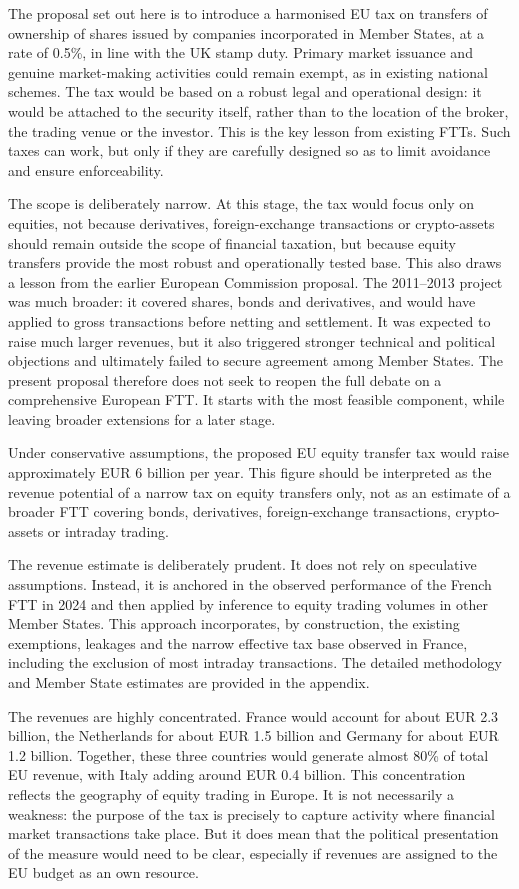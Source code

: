 \documentclass[../main]{subfiles}
\begin{document}
The proposal set out here is to introduce a harmonised EU tax on transfers of ownership of shares issued by companies incorporated in Member States, at a rate of 0.5\%, in line with the UK stamp duty. Primary market issuance and genuine market-making activities could remain exempt, as in existing national schemes. The tax would be based on a robust legal and operational design: it would be attached to the security itself, rather than to the location of the broker, the trading venue or the investor. This is the key lesson from existing FTTs. Such taxes can work, but only if they are carefully designed so as to limit avoidance and ensure enforceability.

The scope is deliberately narrow. At this stage, the tax would focus only on equities, not because derivatives, foreign-exchange transactions or crypto-assets should remain outside the scope of financial taxation, but because equity transfers provide the most robust and operationally tested base. This also draws a lesson from the earlier European Commission proposal. The 2011--2013 project was much broader: it covered shares, bonds and derivatives, and would have applied to gross transactions before netting and settlement. It was expected to raise much larger revenues, but it also triggered stronger technical and political objections and ultimately failed to secure agreement among Member States. The present proposal therefore does not seek to reopen the full debate on a comprehensive European FTT. It starts with the most feasible component, while leaving broader extensions for a later stage.

Under conservative assumptions, the proposed EU equity transfer tax would raise approximately EUR 6 billion per year. This figure should be interpreted as the revenue potential of a narrow tax on equity transfers only, not as an estimate of a broader FTT covering bonds, derivatives, foreign-exchange transactions, crypto-assets or intraday trading.

The revenue estimate is deliberately prudent. It does not rely on speculative assumptions. Instead, it is anchored in the observed performance of the French FTT in 2024 and then applied by inference to equity trading volumes in other Member States. This approach incorporates, by construction, the existing exemptions, leakages and the narrow effective tax base observed in France, including the exclusion of most intraday transactions. The detailed methodology and Member State estimates are provided in the appendix.

The revenues are highly concentrated. France would account for about EUR 2.3 billion, the Netherlands for about EUR 1.5 billion and Germany for about EUR 1.2 billion. Together, these three countries would generate almost 80\% of total EU revenue, with Italy adding around EUR 0.4 billion. This concentration reflects the geography of equity trading in Europe. It is not necessarily a weakness: the purpose of the tax is precisely to capture activity where financial market transactions take place. But it does mean that the political presentation of the measure would need to be clear, especially if revenues are assigned to the EU budget as an own resource.
\end{document}
